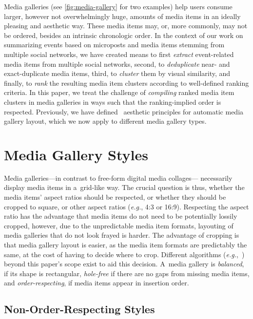 \documentclass{sig-alternate}
\begin{document}
Media galleries (see \autoref{fig:media-gallery} for two examples)
help users consume larger, however not overwhelmingly huge,
amounts of media items in an ideally pleasing and aesthetic way.
These media items may, or, more commonly, may not be ordered,
besides an intrinsic chronologic order.
In the context of our work on summarizing events
based on microposts and media items stemming from
multiple social networks, we have created means
to first \emph{extract} event-related media items
from multiple social networks, second, to
\emph{deduplicate} near- and exact-duplicate media items,
third, to \emph{cluster} them by visual similarity, and
finally, to \emph{rank} the resulting media item clusters
according to well-defined ranking criteria.
In this paper, we treat the challenge of \emph{compiling}
ranked media item clusters in media galleries in ways
such that the ranking-implied order is respected.
Previously, we have defined~\cite{steiner2012definingaesthetic}
aesthetic principles for automatic media gallery layout,
which we now apply to different media gallery types.

\section{Media Gallery Styles}

Media galleries---in contrast to free-form digital media collages---%
necessarily display media items in a~grid-like way.
The crucial question is thus, whether the media items' aspect ratios
should be respected, or whether they should be cropped to square,
or other aspect ratios (\emph{e.g.}, 4:3 or 16:9).
Respecting the aspect ratio has the advantage that media items
do not need to be potentially lossily cropped,
however, due to the unpredictable media item formats,
layouting of media galleries
that do not look frayed is harder.
The advantage of cropping is that media gallery layout is easier,
as the media item formats are predictably the same,
at the cost of having to decide where to crop.
Different algorithms (\emph{e.g.},~\cite{suh2003thumbnail})
beyond this paper's scope exist to aid this decision.
A~media gallery is \emph{balanced}, if its shape is rectangular,
\emph{hole-free} if there are no gaps from missing media items,
and \emph{order-respecting},
if media items appear in insertion order.

\subsection{Non-Order-Respecting Styles}
\end{document}

